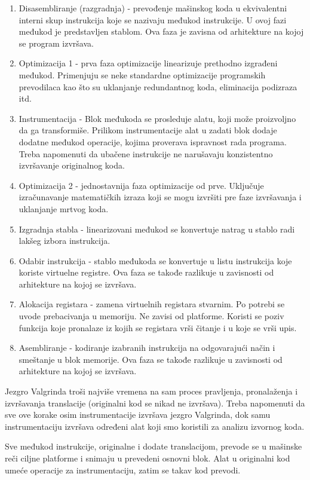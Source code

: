 \begin{enumerate}
\def\labelenumi{\arabic{enumi}.}
\tightlist
\item
  Disasembliranje (razgradnja) - prevođenje mašinskog koda u ekvivalentni interni skup instrukcija koje se nazivaju međukod instrukcije. U ovoj fazi međukod je predstavljen stablom. Ova faza je zavisna od arhitekture na kojoj se program izvršava.
\item
  Optimizacija 1 - prva faza optimizacije linearizuje prethodno izgrađeni međukod. Primenjuju se neke standardne optimizacije programskih prevodilaca kao što su uklanjanje redundantnog koda, eliminacija podizraza itd.
\item
  Instrumentacija - Blok međukoda se prosleduje alatu, koji može proizvoljno da ga transformiše. Prilikom instrumentacije alat u zadati blok dodaje dodatne međukod operacije, kojima proverava ispravnost rada programa. Treba napomenuti da ubačene instrukcije ne narušavaju konzistentno izvršavanje originalnog koda.
\item
  Optimizacija 2 - jednostavnija faza optimizacije od prve. Uključuje izračunavanje matematičkih izraza koji se mogu izvršiti pre faze izvršavanja i uklanjanje mrtvog koda.
\item
  Izgradnja stabla - linearizovani međukod se konvertuje natrag u stablo radi lakšeg izbora instrukcija.
\item
  Odabir instrukcija - stablo međukoda se konvertuje u listu instrukcija koje koriste virtuelne registre. Ova faza se takođe razlikuje u zavisnosti od arhitekture na kojoj se izvršava.
\item
  Alokacija registara - zamena virtuelnih registara stvarnim. Po potrebi se uvode prebacivanja u memoriju. Ne zavisi od platforme. Koristi se poziv funkcija koje pronalaze iz kojih se registara vrši čitanje i u koje se vrši upis.
\item
  Asembliranje - kodiranje izabranih instrukcija na odgovarajući način i smeštanje u blok memorije. Ova faza se takođe razlikuje u zavisnosti od arhitekture na kojoj se izvršava.
\end{enumerate}

Jezgro Valgrinda troši najviše vremena na sam proces pravljenja, pronalaženja i izvršavanja translacije (originalni kod se nikad ne izvršava). Treba napomenuti da sve ove korake osim instrumentacije izvršava jezgro Valgrinda, dok samu instrumentaciju izvršava određeni alat koji smo koristili za analizu izvornog koda.

Sve međukod instrukcije, originalne i dodate translacijom, prevode se u mašinske reči ciljne platforme i snimaju u prevedeni osnovni blok. Alat u originalni kod umeće operacije za instrumentaciju, zatim se takav kod prevodi.

